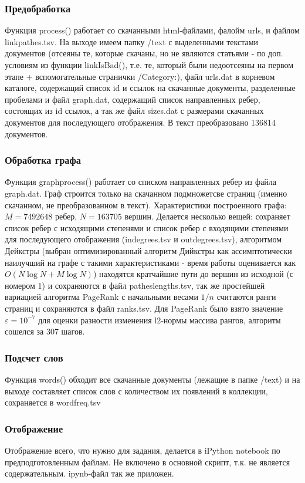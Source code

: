 \documentclass[12pt]{article}
\begin{document}
\subsubsection*{Предобработка}
Функция process() работает со скачанными html-файлами, фалойм urls, и файлом linkpathes.tsv. На выходе имеем папку /text с выделенными текстами документов (отсеяны те, которые скачаны, но не являются статьями - по доп. условиям из функции linkIsBad(), т.е. те, который были недоотсеяны на первом этапе + вспомогательные странички /Category:), файл urls.dat в корневом каталоге, содержащий список id и ссылок на скачанные документы, разделенные пробелами и файл graph.dat, содержащий список направленных ребер, состоящих из id ссылок, а так же файл sizes.dat с размерами скачанных документов для последующего отображения. В текст преобразовано 136814 документов.

\subsubsection*{Обработка графа}
Функция graphprocess() работает со списком направленных ребер из файла graph.dat. Граф строится только на скачанном подмножетсве страниц (именно скачанном, не преобразованном в текст). Характеристики построенного графа: $M=7492648$ ребер, $N=163705$ вершин. Делается несколько вещей: сохраняет список ребер с исходящими степенями и список ребер с входящими степенями для последующего отображения (indegrees.tsv и outdegrees.tsv), алгоритмом Дейкстры (выбран оптимизированный алгоритм Дийкстры как ассимптотически наилучший на графе с такими характеристиками - время работы оценивается как $O(N\log N + M\log N)$) находятся кратчайшие пути до вершин из исходной (с номером 1) и сохраняются в файл patheslengths.tsv, так же простейшей вариацией алгоритма PageRank с начальными весами $1/n$ считаются ранги страниц и сохраняются в файл ranks.tsv. Для PageRank было взято значение $\varepsilon=10^{-7}$ для оценки разности изменения l2-нормы массива рангов, алгоритм сошелся за 307 шагов.

\subsubsection*{Подсчет слов}
Функция words() обходит все скачанные документы (лежащие в папке /text) и на выходе составляет список слов с количеством их появлений в коллекции, сохраняется в wordfreq.tsv

\subsubsection*{Отображение}
Отображение всего, что нужно для задания, делается в iPython notebook по предподготовленным файлам. Не включено в основной скрипт, т.к. не является содержательным. ipynb-файл так же приложен.
\end{document}
